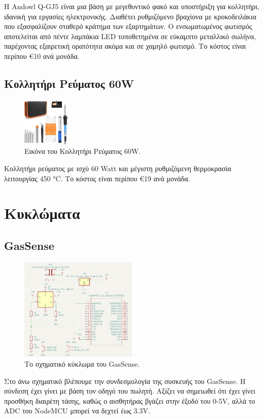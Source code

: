 \documentclass[conference]{IEEEtran}
\begin{document}
Η Andowl Q-GJ5 είναι μια βάση με μεγεθυντικό φακό και υποστήριξη για κολλητήρι, ιδανική για εργασίες ηλεκτρονικής. Διαθέτει ρυθμιζόμενο βραχίονα με κροκοδειλάκια που εξασφαλίζουν σταθερό κράτημα των εξαρτημάτων. Ο ενσωματωμένος φωτισμός αποτελείται από πέντε λαμπάκια LED τοποθετημένα σε εύκαμπτο μεταλλικό σωλήνα, παρέχοντας εξαιρετική ορατότητα ακόμα και σε χαμηλό φωτισμό. Το κόστος είναι περίπου €10 ανά μονάδα. \cite{solderstation}

\subsection{Κολλητήρι Ρεύματος 60W}

\begin{figure}[H]
	\centerline{\includegraphics[width=0.2\textwidth]{assets/solderingkit}}
	\caption{Εικόνα του Κολλητήρι Ρεύματος 60W.}
	\label{Εικόνα του Κολλητήρι Ρεύματος 60W.}
\end{figure}

Κολλητήρι ρεύματος με ισχύ 60 Watt και μέγιστη ρυθμιζόμενη θερμοκρασία λειτουργίας 450 °C. Το κόστος είναι περίπου €19 ανά μονάδα. \cite{solderingkit}

\section{Κυκλώματα}
\subsection{GasSense}

\begin{figure}[H]
	\centerline{\includegraphics[width=0.5\textwidth]{assets/gassense-schematic}}
	\caption{Το σχηματικό κύκλωμα του GasSense.}
	\label{Το σχηματικό κύκλωμα του GasSense.}
\end{figure}
Στο άνω σχηματικό βλέπουμε την συνδεσμολογία της συσκευής του GasSense. Η σύνδεση έχει γίνει με βάση τον οδηγό του πωλητή. \cite{mq6connect} Αξίζει να σημειωθεί ότι έχει γίνει προσθήκη διαιρέτη τάσης, καθώς ο αισθητήρας βγάζει στην έξοδό του 0-5V, αλλά το ADC του NodeMCU μπορεί να δεχτεί έως 3.3V. \cite{adc}
\end{document}
